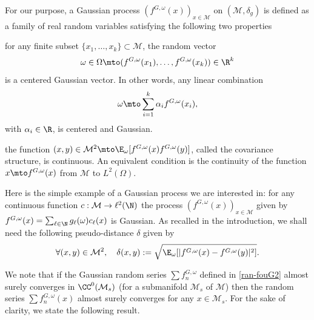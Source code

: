 For our purpose, a Gaussian process $(f^{G,\omega}(x))_{x\in \mathcal{M}}$ on $(\mathcal{M},\delta_g)$ is defined as a family of real random variables satisfying the following two properties
\begin{enumeratei}
\item for any finite subset $\{x_1,\dots,x_k\}\subset \mathcal{M}$, the random vector
\begin{equation*}\omega\in\Omega\mto (f^{G,\omega}(x_1),\dots,f^{G,\omega}(x_k))\in \R^k \end{equation*}
is a centered Gaussian vector. In other words, any linear combination
\[
\omega\mto \sum_{i=1}^k\alpha_i f^{G,\omega}(x_i),
\]
with $\alpha_i\in \R$, is centered and Gaussian.
\item the function $(x,y)\in \mathcal{M}^2\mto \E_{\omega}[f^{G,\omega}(x)f^{G,\omega}(y)]$, called the covariance structure, is continuous. An equivalent condition is the continuity of the function $x\mto f^{G,\omega}(x)$ from $\mathcal{M}$ to $L^2(\Omega)$.
\end{enumeratei}

Here is the simple example of a Gaussian process we are interested in: for any
continuous function $c:\mathcal{M}\to \ell^2(\N)$ the process $(f^{G,\omega}(x))_{x\in \mathcal{M}}$ given by $f^{G,\omega}(x)=\sum_{\ell\in \N} g_\ell(\omega) c_\ell(x)$ is Gaussian.
As recalled in the introduction, we shall need the following pseudo-distance $\delta$ given by
\begin{equation*}
\forall (x,y)\in \mathcal{M}^2, \quad \delta(x,y):=\sqrt{\E_{\omega}[|f^{G,\omega}(x)-f^{G,\omega}(y)|^2]}.
\end{equation*}

We note that if the Gaussian random series $\sum f_n^{G,\omega}$ defined in \eqref{ran-fouG2} almost surely converges in $\CC^0(\mathcal{M}_s)$ (for a submanifold $\mathcal{M}_s$ of $\mathcal{M}$) then the random series $\sum f_n^{G,\omega}(x)$ almost surely converges for any $x\in \mathcal{M}_s$.
For the sake of clarity, we state the following result.

